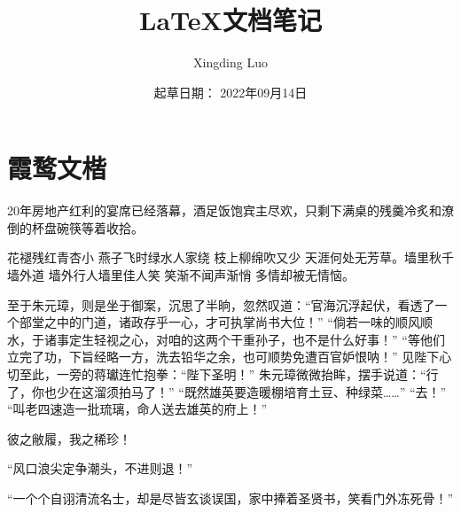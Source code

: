 \documentclass[12pt, letterpaper]{article}
\title{LaTeX文档笔记}
\author{Xingding Luo}
\date{起草日期： 2022年09月14日}
\newcommand{\xwwk}{\CJKfamily{xwwkt}}
\begin{document}
\begin{titlepage}
		\maketitle
\end{titlepage}
		\tableofcontents
		\section{霞鹜文楷}

	{\xwwk 20年房地产红利的宴席已经落幕，酒足饭饱宾主尽欢，只剩下满桌的残羹冷炙和潦倒的杯盘碗筷等着收拾。}

		花褪残红青杏小 燕子飞时绿水人家绕 枝上柳绵吹又少 天涯何处无芳草。墙里秋千墙外道 墙外行人墙里佳人笑  笑渐不闻声渐悄 多情却被无情恼。

		至于朱元璋，则是坐于御案，沉思了半晌，忽然叹道：“官海沉浮起伏，看透了一个部堂之中的门道，诸政存乎一心，才可执掌尚书大位！”
		“倘若一味的顺风顺水，于诸事定生轻视之心，对咱的这两个干重孙子，也不是什么好事！”
		“等他们立完了功，下旨经略一方，洗去铅华之余，也可顺势免遭百官妒恨呐！”
		见陛下心切至此，一旁的蒋瓛连忙抱拳：“陛下圣明！”
		朱元璋微微抬眸，摆手说道：“行了，你也少在这溜须拍马了！”
		“既然雄英要造暖棚培育土豆、种绿菜……”
		“去！”
		“叫老四速造一批琉璃，命人送去雄英的府上！”

		彼之敝履，我之稀珍！

		“风口浪尖定争潮头，不进则退！”

		“一个个自诩清流名士，却是尽皆玄谈误国，家中捧着圣贤书，笑看门外冻死骨！”
\end{document}
